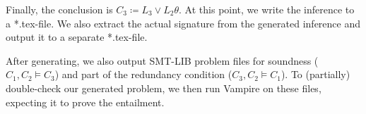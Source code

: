 Finally, the conclusion is $C_3 \coloneqq L_3 \lor L_2\theta$.
At this point, we write the inference to a *.tex-file.
We also extract the actual signature from the generated inference and output it to a separate *.tex-file.

After generating, we also output SMT-LIB problem files for
soundness ($C_1, C_2 \models C_3$)
and part of the redundancy condition
($C_3, C_2 \models C_1$). %
To (partially) double-check our generated problem, we then run Vampire on these files,
expecting it to prove the entailment.
